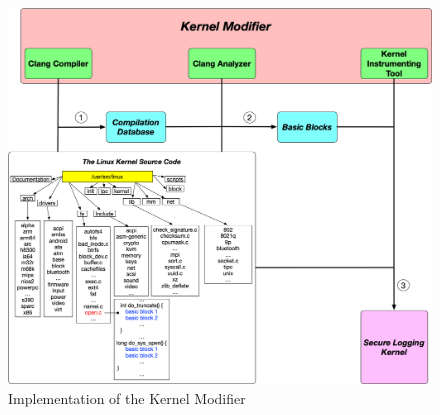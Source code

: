 \begin{figure}
\centering
\includegraphics[width=1.5\columnwidth]{diagram/linuxkit-kernel-modifier.png}
\caption{\small Implementation of the Kernel Modifier}
\label{fig:linuxkit-kernel-modifier}
\end{figure}
